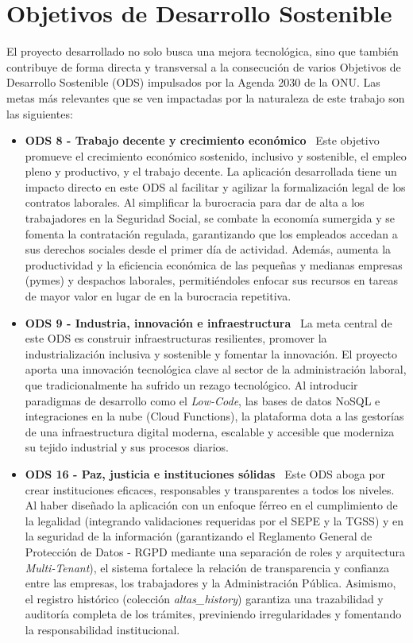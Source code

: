 \section{Objetivos de Desarrollo Sostenible} \label{sct:impacto:ods}
El proyecto desarrollado no solo busca una mejora tecnológica, sino que también contribuye de forma directa y transversal a la consecución de varios Objetivos de Desarrollo Sostenible (ODS) impulsados por la Agenda 2030 de la ONU. Las metas más relevantes que se ven impactadas por la naturaleza de este trabajo son las siguientes:
\begin{itemize}
\item \textbf{ODS 8 - Trabajo decente y crecimiento económico} \ Este objetivo promueve el crecimiento económico sostenido, inclusivo y sostenible, el empleo pleno y productivo, y el trabajo decente. La aplicación desarrollada tiene un impacto directo en este ODS al facilitar y agilizar la formalización legal de los contratos laborales. Al simplificar la burocracia para dar de alta a los trabajadores en la Seguridad Social, se combate la economía sumergida y se fomenta la contratación regulada, garantizando que los empleados accedan a sus derechos sociales desde el primer día de actividad. Además, aumenta la productividad y la eficiencia económica de las pequeñas y medianas empresas (pymes) y despachos laborales, permitiéndoles enfocar sus recursos en tareas de mayor valor en lugar de en la burocracia repetitiva.
\item \textbf{ODS 9 - Industria, innovación e infraestructura} \ La meta central de este ODS es construir infraestructuras resilientes, promover la industrialización inclusiva y sostenible y fomentar la innovación. El proyecto aporta una innovación tecnológica clave al sector de la administración laboral, que tradicionalmente ha sufrido un rezago tecnológico. Al introducir paradigmas de desarrollo como el \textit{Low-Code}, las bases de datos NoSQL e integraciones en la nube (Cloud Functions), la plataforma dota a las gestorías de una infraestructura digital moderna, escalable y accesible que moderniza su tejido industrial y sus procesos diarios.
\item \textbf{ODS 16 - Paz, justicia e instituciones sólidas} \ Este ODS aboga por crear instituciones eficaces, responsables y transparentes a todos los niveles. Al haber diseñado la aplicación con un enfoque férreo en el cumplimiento de la legalidad (integrando validaciones requeridas por el SEPE y la TGSS) y en la seguridad de la información (garantizando el Reglamento General de Protección de Datos - RGPD mediante una separación de roles y arquitectura \textit{Multi-Tenant}), el sistema fortalece la relación de transparencia y confianza entre las empresas, los trabajadores y la Administración Pública. Asimismo, el registro histórico (colección \textit{altas\_history}) garantiza una trazabilidad y auditoría completa de los trámites, previniendo irregularidades y fomentando la responsabilidad institucional.
\end{itemize}

